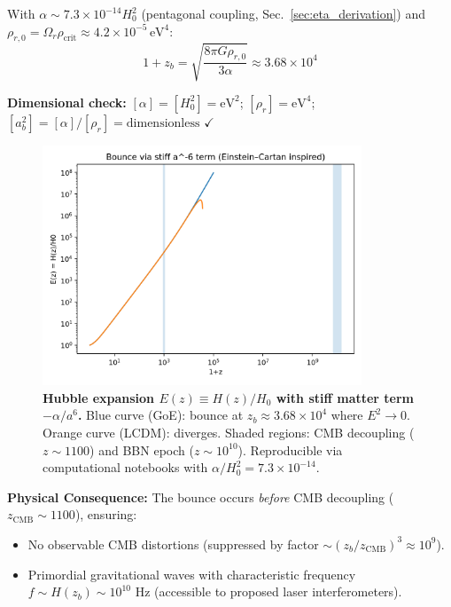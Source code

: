 \documentclass[12pt]{article}
\begin{document}
With $\alpha \sim 7.3 \times 10^{-14} H_0^2$ (pentagonal coupling, Sec.~\ref{sec:eta_derivation}) and $\rho_{r,0} = \Omega_r \rho_{\text{crit}} \approx 4.2 \times 10^{-5} \, \text{eV}^4$:
\begin{equation}
1 + z_b = \sqrt{\frac{8\pi G \rho_{r,0}}{3\alpha}} \approx 3.68 \times 10^4
\end{equation}

\textbf{Dimensional check:} $[\alpha] = [H_0^2] = \text{eV}^2$; $[\rho_r] = \text{eV}^4$; $[a_b^2] = [\alpha]/[\rho_r] = \text{dimensionless}$ $\checkmark$

\begin{figure}[h]
\centering
\includegraphics[width=0.85\textwidth]{figures/Ez_bounce.png}
\caption{\textbf{Hubble expansion $E(z) \equiv H(z)/H_0$ with stiff matter term $-\alpha/a^6$.} Blue curve (GoE): bounce at $z_b \approx 3.68 \times 10^4$ where $E^2 \to 0$. Orange curve (LCDM): diverges. Shaded regions: CMB decoupling ($z \sim 1100$) and BBN epoch ($z \sim 10^{10}$). Reproducible via computational notebooks with $\alpha/H_0^2 = 7.3 \times 10^{-14}$.}
\label{fig:Ez_bounce}
\end{figure}

\textbf{Physical Consequence:} The bounce occurs \textit{before} CMB decoupling ($z_{\text{CMB}} \sim 1100$), ensuring:
\begin{itemize}
\item No observable CMB distortions (suppressed by factor $\sim (z_b/z_{\text{CMB}})^3 \approx 10^9$).
\item Primordial gravitational waves with characteristic frequency $f \sim H(z_b) \sim 10^{10}$ Hz (accessible to proposed laser interferometers).
\end{itemize}
\end{document}
